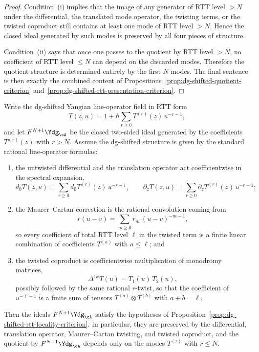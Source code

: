 \begin{proof}
Condition~\textup{(i)} implies that the image of any generator of RTT
level $>N$ under the differential, the translated mode operator, the
twisting terms, or the twisted coproduct still contains at least one
mode of RTT level $>N$.  Hence the closed ideal generated by such modes
is preserved by all four pieces of structure.

Condition~\textup{(ii)} says that once one passes to the quotient by
RTT level $>N$, no coefficient of RTT level $\le N$ can depend on the
discarded modes.  Therefore the quotient structure is determined
entirely by the first $N$ modes.  The final sentence is then exactly
the combined content of
Propositions~\ref{prop:dg-shifted-quotient-criterion}
and~\ref{prop:dg-shifted-rtt-presentation-criterion}.
\end{proof}

\begin{proposition}
\label{prop:dg-shifted-rtt-formula-preservation}
Write the dg-shifted Yangian line-operator field in RTT form
\[
T(z,u)=1+\hbar\sum_{r \ge 0} T^{(r)}(z)\,u^{-r-1},
\]
and let $F^{N+1}\Ydg_{\cA}$ be the closed two-sided ideal generated by
the coefficients $T^{(r)}(z)$ with $r>N$.  Assume the
dg-shifted structure is given by the standard rational line-operator
formulas:
\begin{enumerate}[label=\textup{(\roman*)}]
\item the untwisted differential and the translation operator act
  coefficientwise in the spectral expansion,
  \[
  d_0 T(z,u)=\sum_{r \ge 0} d_0T^{(r)}(z)\,u^{-r-1},
  \qquad
  \partial_z T(z,u)=\sum_{r \ge 0} \partial_zT^{(r)}(z)\,u^{-r-1};
  \]
\item the Maurer--Cartan correction is the rational convolution coming
  from
  \[
  r(u-v)=\sum_{m \ge 0} r_m\,(u-v)^{-m-1},
  \]
  so every coefficient of total RTT level $\ell$ in the twisted term is
  a finite linear combination of coefficients $T^{(a)}$ with
  $a \le \ell$; and
\item the twisted coproduct is coefficientwise multiplication of
  monodromy matrices,
  \[
  \Delta^{\mathrm{tw}}T(u)=T_1(u)\,T_2(u),
  \]
  possibly followed by the same rational $r$-twist, so that the
  coefficient of $u^{-\ell-1}$ is a finite sum of tensors
  $T^{(a)}\otimes T^{(b)}$ with $a+b=\ell$.
\end{enumerate}
Then the ideals $F^{N+1}\Ydg_{\cA}$ satisfy the hypotheses of
Proposition~\ref{prop:dg-shifted-rtt-locality-criterion}.  In
particular, they are preserved by the differential, translation
operator, Maurer--Cartan twisting, and twisted coproduct, and the
quotient by $F^{N+1}\Ydg_{\cA}$ depends only on the modes
$T^{(r)}$ with $r \le N$.
\end{proposition}

